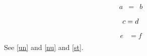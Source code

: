 \documentclass{article}
\begin{document}
\begin{eqnarray}
a &=& b \\
\label{un}\nonumber
\end{eqnarray}
\begin{align}
c &= d \notag\\
\label{nu}
\end{align}
\begin{align*}
e &= f \\
\label{st}
\end{align*}
See \ref{un} and \ref{nu} and \ref{st}.
\end{document}
